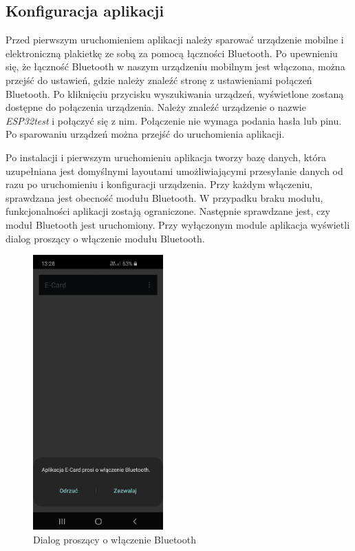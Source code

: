 \documentclass[a4paper,12pt, twoside]{article}
\begin{document}
    	\subsection{Konfiguracja aplikacji}
    	Przed pierwszym uruchomieniem aplikacji należy sparować urządzenie mobilne i elektroniczną plakietkę ze sobą za pomocą łączności Bluetooth. Po upewnieniu się, że łączność Bluetooth w naszym urządzeniu mobilnym jest włączona, można przejść do ustawień, gdzie należy znaleźć stronę z ustawieniami połączeń Bluetooth. Po kliknięciu przycisku wyszukiwania urządzeń, wyświetlone zostaną dostępne do połączenia urządzenia. Należy znaleźć urządzenie o nazwie \textit{ESP32test} i połączyć się z nim. Połączenie nie wymaga podania hasła lub pinu. Po sparowaniu urządzeń można przejść do uruchomienia aplikacji. 
    	
    	Po instalacji i pierwszym uruchomieniu aplikacja tworzy bazę danych, która uzupełniana jest domyślnymi layoutami umożliwiającymi przesyłanie danych od razu po uruchomieniu i konfiguracji urządzenia. Przy każdym włączeniu, sprawdzana jest obecność modułu Bluetooth. W przypadku braku modułu, funkcjonalności aplikacji zostają ograniczone. Następnie sprawdzane jest, czy moduł Bluetooth jest uruchomiony. Przy wyłączonym module aplikacja wyświetli dialog proszący o włączenie modułu Bluetooth.
    	
    	\begin{figure}[H]
    	        \centering
    			\includegraphics[width=5cm]{images/rys_13bluetoothdialog.jpg}
    			\caption{Dialog proszący o włączenie Bluetooth}
                \label{fig:bton}
    	\end{figure}
    	
\end{document}
